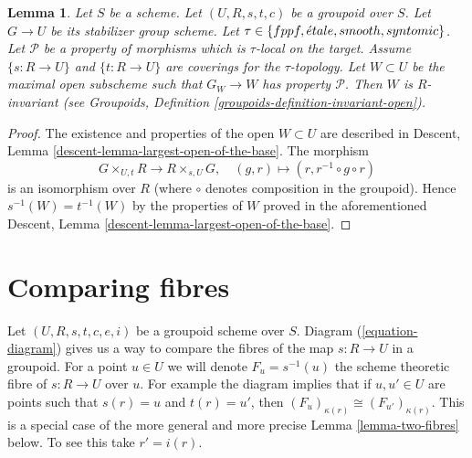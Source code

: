 \documentclass{stacks-project}
\theoremstyle{plain}
\newtheorem{lemma}[subsection]{Lemma}
\theoremstyle{definition}
\theoremstyle{remark}
\numberwithin{equation}{subsection}
\def\etale{{\acute{e}tale}}
\begin{document}
\begin{lemma}
\label{lemma-property-G-invariant}
Let $S$ be a scheme.
Let $(U, R, s, t, c)$ be a groupoid over $S$.
Let $G \to U$ be its stabilizer group scheme.
Let $\tau \in \{fppf, \linebreak[0] \etale, \linebreak[0]
smooth, \linebreak[0] syntomic\}$.
Let $\mathcal{P}$ be a property of morphisms which is $\tau$-local
on the target. Assume $\{s : R \to U\}$ and $\{t : R \to U\}$ are coverings
for the $\tau$-topology. Let $W \subset U$ be the maximal open subscheme
such that $G_W \to W$ has property $\mathcal{P}$. Then $W$ is $R$-invariant
(see
Groupoids, Definition
\ref{groupoids-definition-invariant-open}).
\end{lemma}

\begin{proof}
The existence and properties of the open $W \subset U$ are described in
Descent, Lemma \ref{descent-lemma-largest-open-of-the-base}.
The morphism
$$
G \times_{U, t} R \longrightarrow R \times_{s, U} G, \quad
(g, r) \longmapsto (r, r^{-1} \circ g \circ r)
$$
is an isomorphism over $R$ (where $\circ$ denotes
composition in the groupoid). Hence $s^{-1}(W) = t^{-1}(W)$ by the
properties of $W$ proved in the aforementioned
Descent, Lemma \ref{descent-lemma-largest-open-of-the-base}.
\end{proof}



\section{Comparing fibres}
\label{section-fibres}

\noindent
Let $(U, R, s, t, c, e, i)$ be a groupoid scheme over $S$.
Diagram (\ref{equation-diagram})
gives us a way to compare the fibres of the map $s : R \to U$ in a groupoid.
For a point $u \in U$ we will denote $F_u = s^{-1}(u)$ the scheme
theoretic fibre of $s : R \to U$ over $u$. For example the diagram
implies that if $u, u' \in U$ are points such
that $s(r) = u$ and $t(r) = u'$, then
$(F_u)_{\kappa(r)} \cong (F_{u'})_{\kappa(r)}$.
This is a special case of the more general and more precise
Lemma \ref{lemma-two-fibres}
below. To see this take $r' = i(r)$.
\end{document}
